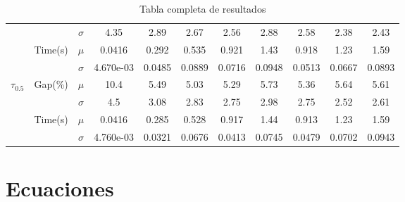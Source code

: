 \documentclass[spanish, a4paper, 12pt, openany,final]{book}
\begin{document}
\begin{table}[h]
\begin{adjustbox}{width=\columnwidth,center}
\begin{tabular}{|ccc|cccccccc|}
			&                                                         & $\sigma$ & 4.35 & 2.89 & 2.67 & 2.56 & 2.88 & 2.58 & 2.38 & 2.43 \\
			\cline{3-11}
			& \multirow{2}{*}{Time(s)}                                & $\mu$    & 0.0416 & 0.292 & 0.535 & 0.921 & 1.43 & 0.918 & 1.23 & 1.59\\
			&                                                         & $\sigma$ & 4.670e-03 & 0.0485 & 0.0889 & 0.0716 & 0.0948 & 0.0513 & 0.0667 & 0.0893 \\
			\hline
			\multirow{4}{*}{$\tau_{0.5}$}& \multirow{2}{*}{Gap(\%)}   & $\mu$    & 10.4 & 5.49 & 5.03 & 5.29 & 5.73 & 5.36 & 5.64 & 5.61\\
			&                                                         & $\sigma$ & 4.5 & 3.08 & 2.83 & 2.75 & 2.98 & 2.75 & 2.52 & 2.61 \\
			\cline{3-11}
			& \multirow{2}{*}{Time(s)}                                & $\mu$    & 0.0416 & 0.285 & 0.528 & 0.917 & 1.44 & 0.913 & 1.23 & 1.59\\
			&                                                         & $\sigma$ & 4.760e-03 & 0.0321 & 0.0676 & 0.0413 & 0.0745 & 0.0479 & 0.0702 & 0.0943 \\
			\hline
		\end{tabular}
	\end{adjustbox}
	
	\caption{Tabla completa de resultados}\label{tab:full_comparison_table}
\end{table}







\chapter{Ecuaciones}
\end{document}
